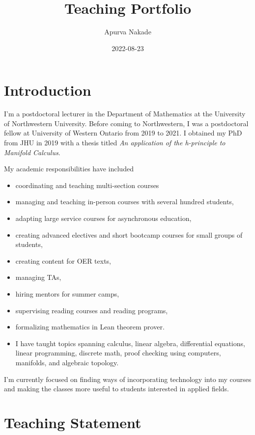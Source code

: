 \documentclass[
]{report}
\title{Teaching Portfolio}
\author{Apurva Nakade}
\date{2022-08-23}
\providecommand{\tightlist}{%
  \setlength{\itemsep}{0pt}\setlength{\parskip}{0pt}}
\begin{document}
\maketitle

\thispagestyle{empty}

{
\setcounter{tocdepth}{2}
\tableofcontents
}
\hypertarget{introduction}{%
\chapter*{Introduction}\label{introduction}}


I'm a postdoctoral lecturer in the Department of Mathematics at the University of Northwestern
University. Before coming to Northwestern, I was a postdoctoral fellow at University of Western
Ontario from 2019 to 2021. I obtained my PhD from JHU in 2019 with a thesis titled \emph{An application of
the h-principle to Manifold Calculus}.

My academic responsibilities have included

\begin{itemize}
\tightlist
\item
  coordinating and teaching multi-section courses
\item
  managing and teaching in-person courses with several hundred students,
\item
  adapting large service courses for asynchronous education,\\
\item
  creating advanced electives and short bootcamp courses for small groups of students,
\item
  creating content for OER texts,
\item
  managing TAs,
\item
  hiring mentors for summer camps,
\item
  supervising reading courses and reading programs,
\item
  formalizing mathematics in Lean theorem prover.
\item
  I have taught topics spanning calculus, linear algebra, differential equations, linear programming, discrete math, proof checking using computers, manifolds, and algebraic topology.
\end{itemize}

I'm currently focused on finding ways of incorporating technology into my courses and making the classes more useful to students interested in applied fields.

\hypertarget{teaching-statement}{%
\chapter{Teaching Statement}\label{teaching-statement}}
\end{document}
